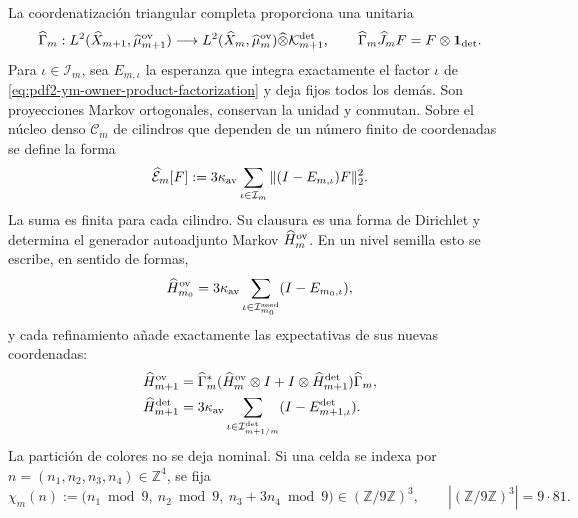 La coordenatización triangular completa proporciona una unitaria
\begin{equation}\label{eq:pdf2-ym-owner-triangular-unitary}
 \widehat\Gamma_m:
 L^2(\widehat X_{m+1},\widehat\mu_{m+1}^{\rm ov})
 \longrightarrow
 L^2(\widehat X_m,\widehat\mu_m^{\rm ov})
 \widehat\otimes\mathcal K_{m+1}^{\rm det},
 \qquad
 \widehat\Gamma_m\widehat J_mF=F\otimes\mathbf1_{\rm det}.
\end{equation}
Para $\iota\in\mathcal I_m$, sea $E_{m,\iota}$ la esperanza que integra
exactamente el factor $\iota$ de
\eqref{eq:pdf2-ym-owner-product-factorization} y deja fijos todos los demás.
Son proyecciones Markov ortogonales, conservan la unidad y conmutan. Sobre el
núcleo denso $\mathscr C_m$ de cilindros que dependen de un número finito de
coordenadas se define la forma
\begin{equation}\label{eq:pdf2-ym-owner-full-form}
 \widehat{\mathcal E}_m[F]
 :=3\kappa_{\rm av}\sum_{\iota\in\mathcal I_m}
   \|(I-E_{m,\iota})F\|_2^2.
\end{equation}
La suma es finita para cada cilindro. Su clausura es una forma de Dirichlet y
determina el generador autoadjunto Markov
$\widehat H_m^{\rm ov}$. En un nivel semilla esto se escribe, en sentido de
formas,
\begin{equation}\label{eq:pdf2-ym-owner-base-generator}
 \widehat H_{m_0}^{\rm ov}
 =3\kappa_{\rm av}
  \sum_{\iota\in\mathcal I_{m_0}^{\rm seed}}(I-E_{m_0,\iota}),
\end{equation}
y cada refinamiento añade exactamente las expectativas de sus nuevas coordenadas:
\begin{equation}\label{eq:pdf2-ym-owner-refined-generator}
 \begin{aligned}
 \widehat H_{m+1}^{\rm ov}
 &=\widehat\Gamma_m^*
   (\widehat H_m^{\rm ov}\otimes I
    +I\otimes\widehat H_{m+1}^{\rm det})\widehat\Gamma_m,\\
 \widehat H_{m+1}^{\rm det}
 &=3\kappa_{\rm av}
   \sum_{\iota\in\mathcal I_{m+1/m}^{\rm det}}
   (I-E_{m+1,\iota}^{\rm det}).
 \end{aligned}
\end{equation}
La partición de colores no se deja nominal. Si una celda se indexa por
$n=(n_1,n_2,n_3,n_4)\in\mathbb Z^4$, se fija
\begin{equation}\label{eq:pdf2-ym-owner-729-coloring}
 \chi_m(n):=
 \bigl(n_1\bmod9,\ n_2\bmod9,\ n_3+3n_4\bmod9\bigr)
 \in(\mathbb Z/9\mathbb Z)^3,
 \qquad |(\mathbb Z/9\mathbb Z)^3|=9\cdot81.
\end{equation}
